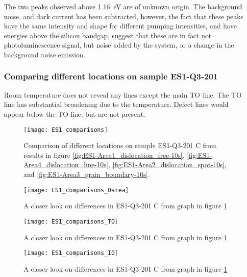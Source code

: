 The two peaks observed above 1.16~eV are of unknown origin. The background noise, and dark current has been subtracted, however, the fact that these peaks have the same intensity and shape for different pumping intensities, and have energies above the silicon bandgap, suggest that these are in fact not photoluminescence signal, but noise added by the system, or a change in the background noise emission.



\subsubsection{Comparing different locations on sample ES1-Q3-201}

Room temperature does not reveal any lines except the main TO line. The TO line has substantial broadening due to the temperature. Defect lines would appear below the TO line, but are not present.


\begin{figure}[H]
\centering
\texttt{[image: ES1\_comparisons]}
\caption[ES1-Q3-201 comparisons]{Comparison of different locations on sample ES1-Q3-201 C from results in figure \ref{fig:ES1-Area1_dislocation_free-10s}, \ref{fig:ES1-Area4_dislocation_line-10s}, \ref{fig:ES1-Area2_dislocation_spot-10s}, and \ref{fig:ES1-Area3_grain_boundary-10s}. }
\label{fig:ES1_comparisons}%
\end{figure}

\begin{figure}[H]
\centering
\texttt{[image: ES1\_comparisons\_Darea]}
\caption[ES1-Q3-201 comparisons close]{A closer look on differences in ES1-Q3-201 C from graph in figure \ref{fig:ES1_comparisons} }
\label{fig:ES1_comparisons_Darea}%
\end{figure}

\begin{figure}[H]
\centering
\texttt{[image: ES1\_comparisons\_TO]}
\caption[ES1-Q3-201 comparisons close]{A closer look on differences in ES1-Q3-201 C from graph in figure \ref{fig:ES1_comparisons} }
\label{fig:ES1_comparisons_TO}%
\end{figure}

\begin{figure}[H]
\centering
\texttt{[image: ES1\_comparisons\_I0]}
\caption[ES1-Q3-201 comparisons close]{A closer look on differences in ES1-Q3-201 C from graph in figure \ref{fig:ES1_comparisons} }
\label{fig:ES1_comparisons_I0}%
\end{figure}


